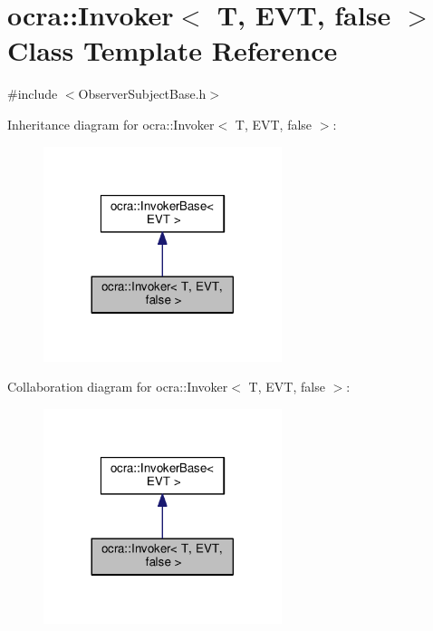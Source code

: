 \hypertarget{classocra_1_1Invoker_3_01T_00_01EVT_00_01false_01_4}{}\section{ocra\+:\+:Invoker$<$ T, E\+VT, false $>$ Class Template Reference}
\label{classocra_1_1Invoker_3_01T_00_01EVT_00_01false_01_4}


{\ttfamily \#include $<$Observer\+Subject\+Base.\+h$>$}



Inheritance diagram for ocra\+:\+:Invoker$<$ T, E\+VT, false $>$\+:
\nopagebreak
\begin{figure}[H]
\begin{center}
\leavevmode
\includegraphics[width=197pt]{d4/dde/classocra_1_1Invoker_3_01T_00_01EVT_00_01false_01_4__inherit__graph}
\end{center}
\end{figure}


Collaboration diagram for ocra\+:\+:Invoker$<$ T, E\+VT, false $>$\+:
\nopagebreak
\begin{figure}[H]
\begin{center}
\leavevmode
\includegraphics[width=197pt]{d7/d94/classocra_1_1Invoker_3_01T_00_01EVT_00_01false_01_4__coll__graph}
\end{center}
\end{figure}

